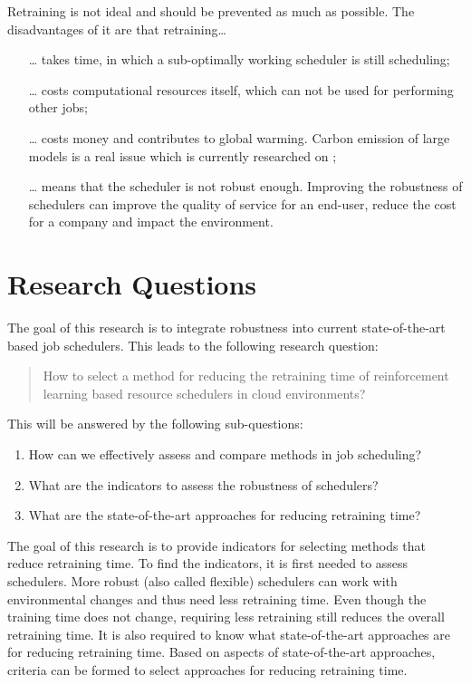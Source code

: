 Retraining is not ideal and should be prevented as much as possible. The
disadvantages of it are that retraining\dots

\begin{itemize}[noitemsep]
    \item[\dots] takes time, in which a sub-optimally working scheduler is
        still scheduling;
    \item[\dots] costs computational resources itself, which can not be used
        for performing other jobs;
    \item[\dots] costs money and contributes to global warming. Carbon
        emission of large \ml models is a real issue which is currently
        researched on \cite{patterson2021};
    \item[\dots] means that the scheduler is not robust enough. Improving the
        robustness of schedulers can improve the quality of service for an
        end-user, reduce the cost for a company and impact the environment.
\end{itemize}


\section{Research Questions}

The goal of this research is to integrate robustness into current
state-of-the-art \ml based job schedulers. This leads to the following
research question:
\begin{quote}
How to select a method for reducing the retraining time of reinforcement learning
    based resource schedulers in cloud environments?
\end{quote}
This will be answered by the following sub-questions:
\begin{enumerate}[noitemsep]
    \item How can we effectively assess and compare \rlbased methods in job
        scheduling?
    \item What are the indicators to assess the robustness of \rlbased schedulers?
    \item What are the state-of-the-art approaches for reducing retraining time?
\end{enumerate}
The goal of this research is to provide indicators for selecting methods that
reduce retraining time. To find the indicators, it is first needed to assess
\rlbased schedulers. More robust (also called flexible) \rlbased schedulers
can work with environmental changes and thus need less retraining time.
Even though the training time does not change, requiring less retraining still
reduces the overall retraining time. It is also required to know what
state-of-the-art approaches are for reducing retraining time. Based on
aspects of state-of-the-art approaches, criteria can be formed to select
approaches for reducing retraining time.

